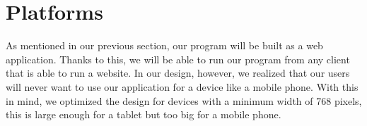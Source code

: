 \section{Platforms}
As mentioned in our previous section, our program will be built as a web application. Thanks to this, we will be able to run our program from any client that is able to run a website. In our design, however, we realized that our users will never want to use our application for a device like a mobile phone. With this in mind, we optimized the design for devices with a minimum width of 768 pixels, this is large enough for a tablet but too big for a mobile phone. 
